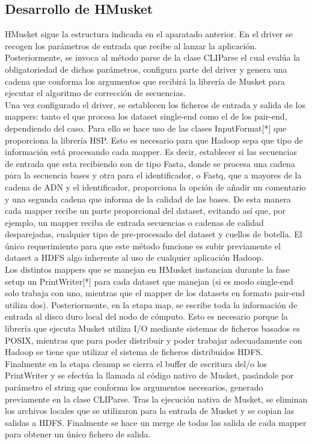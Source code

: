 \documentclass[conference]{IEEEtran}
\begin{document}
\subsection{Desarrollo de HMusket}
HMusket sigue la estructura indicada en el aparatado anterior. En el driver se recogen los parámetros de entrada que recibe al lanzar la aplicación. Posteriormente, se invoca al método parse de la clase CLIParse el cual evalúa la obligatoriedad de dichos parámetros, configura parte del driver y genera una cadena que conforma los argumentos que recibirá la librería de Musket para ejecutar el algoritmo de corrección de secuencias.\\
Una vez configurado el driver, se establecen los ficheros de entrada y salida de los mappers: tanto el que procesa los dataset single-end como el de los pair-end, dependiendo del caso. Para ello se hace uso de las clases InputFormat[*] que proporciona la librería HSP. Esto es necesario para que Hadoop sepa que tipo de información está procesando cada mapper. Es decir, establecer si las secuencias de entrada que esta recibiendo son de tipo Fasta, donde se procesa una cadena para la secuencia bases y otra para el identificador, o Fastq, que a mayores de la cadena de ADN y el identificador, proporciona la opción de añadir un comentario y una segunda cadena que informa de la calidad de las bases. De esta manera cada mapper recibe un parte proporcional del dataset, evitando así que, por ejemplo, un mapper reciba de entrada secuencias o cadenas de calidad desparejadas, cualquier tipo de pre-procesado del dataset y cuellos de botella. El único requerimiento para que este método funcione es subir previamente el dataset a HDFS algo inherente al uso de cualquier aplicación Hadoop.\\

Los distintos mappers que se manejan en HMusket instancian durante la fase setup un PrintWriter[*] para cada dataset que manejan (si es modo single-end solo trabaja con uno, mientras que el mapper de los datasets en formato pair-end utiliza dos). Posteriormente, en la etapa map, se escribe toda la información de entrada al disco duro local del nodo de cómputo. Esto es necesario porque la librería que ejecuta Musket utiliza I/O mediante sistemas de ficheros basados es POSIX, mientras que para poder distribuir y poder trabajar adecuadamente con Hadoop se tiene que utilizar el sistema de ficheros distribuidos HDFS.\\
Finalmente en la etapa cleanup se cierra el buffer de escritura del/o los PrintWriter y se efectúa la llamada al código nativo de Musket, pasándole por parámetro el string que conforma los argumentos necesarios, generado previamente en la clase CLIParse. Tras la ejecución nativa de Musket, se eliminan los archivos locales que se utilizaron para la entrada de Musket y se copian las salidas a HDFS. Finalmente se hace un merge de todas las salida de cada mapper para obtener un único fichero de salida.\\
\end{document}
